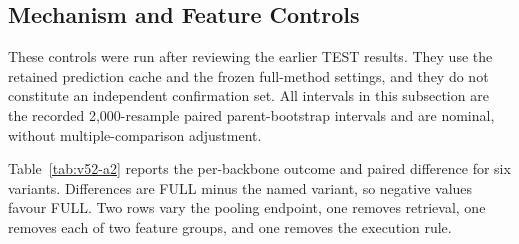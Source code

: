 \documentclass{article}
\begin{document}
\subsection{Mechanism and Feature Controls}
\label{app:estimation-analyses}
These controls were run after reviewing the earlier TEST results. They use the retained
prediction cache and the frozen full-method settings, and they do not constitute an
independent confirmation set. All intervals in this subsection are the recorded
2,000-resample paired parent-bootstrap intervals and are nominal, without
multiple-comparison adjustment.

Table~\ref{tab:v52-a2} reports the per-backbone outcome and paired difference for six
variants. Differences are FULL minus the named variant, so negative values favour FULL.
Two rows vary the pooling endpoint, one removes retrieval, one removes each of two feature
groups, and one removes the execution rule.
\end{document}
